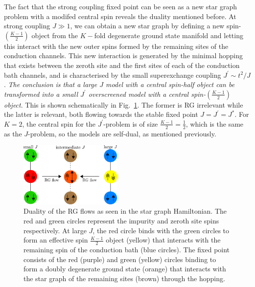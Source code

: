 \documentclass[12pt]{revtex4-2}
\begin{document}
The fact that the strong coupling fixed point can be seen as a new star graph problem with a modifed central spin reveals the duality mentioned before. At strong coupling \(J \gg 1\), we can obtain a new star graph by defining a new spin-\(\left(\frac{K-1}{2}\right)\) object from the \(K-\)fold degenerate ground state manifold and letting this interact with the new outer spins formed by the remaining sites of the conduction channels. This new interaction is generated by the minimal hopping that exists between the zeroth site and the first sites of each of the conduction bath channels, and is characterised by the small superexchange coupling \(J^\prime \sim t^2/J\). \textit{The conclusion is that a large \(J\) model with a central spin-half object can be transformed into a small \(J^\prime\) overscreened model with a central spin-\(\left(\frac{K-1}{2}\right)\) object}. This is shown schematically in Fig.~\ref{duality_fig}. The former is RG irrelevant while the latter is relevant, both flowing towards the stable fixed point \(J = J^\prime = J^*\). For \(K=2\), the central spin for the \(J^\prime\)-problem is of size \(\frac{K-1}{2} = \frac{1}{2}\), which is the same as the \(J\)-problem, so the models are self-dual, as mentioned previously.

\begin{figure}[htpb]
	\centering
	\includegraphics[width=0.45\textwidth]{./duality.pdf}
	\caption{Duality of the RG flows as seen in the star graph Hamiltonian. The red and green circles represent the impurity and zeroth site spins respectively. At large \(J\), the red circle binds with the green circles to form an effective spin \(\frac{K-1}{2}\) object (yellow) that interacts with the remaining spin of the conduction bath (blue circles). The fixed point consists of the red (purple) and green (yellow) circles binding to form a doubly degenerate ground state (orange) that interacts with the star graph of the remaining sites (brown) through the hopping.}
	\label{duality_fig}
\end{figure}
\end{document}
